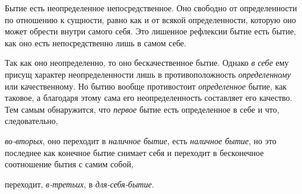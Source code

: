 Бытие есть неопределенное непосредственное. Оно
свободно от определенности по отношению к сущности,
равно как и от всякой определенности, которую оно может
обрести внутри самого себя. Это лишенное рефлексии
бытие есть бытие, как оно есть непосредственно
лишь в самом себе.

Так как оно неопределенно, то оно бескачественное
бытие. Однако \emph{в себе} ему присущ характер неопределенности
лишь в противоположность \emph{определенному} или качественному.
Но бытию вообще противостоит \emph{определенное}
бытие, как таковое, а благодаря этому сама его
неопределенность составляет его качество. Тем самым обнаружится,
что \emph{первое} бытие есть определенное в себе и
что, следовательно,

\emph{во-вторых}, оно переходит в \emph{наличное бытие}, есть \emph{наличное
бытие}, но это последнее как конечное бытие снимает
себя и переходит в бесконечное соотношение бытия
с самим собой,

переходит, \emph{в-третьих}, в \emph{для-себя-бытие}.


